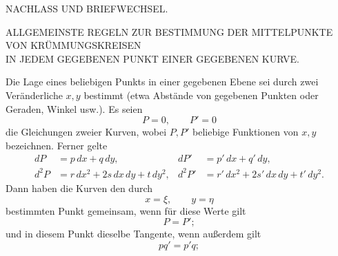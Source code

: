 %
\begin{center}
{\large NACHLASS UND BRIEFWECHSEL.\par}
\bigskip
ALLGEMEINSTE REGELN ZUR BESTIMMUNG DER MITTELPUNKTE VON KRÜMMUNGSKREISEN\\
IN JEDEM GEGEBENEN PUNKT EINER GEGEBENEN KURVE.
\end{center}

Die Lage eines beliebigen Punkts in einer gegebenen Ebene sei durch zwei Veränderliche $x,y$ bestimmt (etwa Abstände von gegebenen Punkten oder Geraden, Winkel usw.). Es seien
\[
P=0,\qquad P'=0
\]
die Gleichungen zweier Kurven, wobei $P,P'$ beliebige Funktionen von $x,y$ bezeichnen. Ferner gelte
\[
\begin{aligned}
dP&=p\,dx+q\,dy,&dP'&=p'\,dx+q'\,dy,\\
d^2P&=r\,dx^2+2s\,dx\,dy+t\,dy^2,&d^2P'&=r'\,dx^2+2s'\,dx\,dy+t'\,dy^2.
\end{aligned}
\]
Dann haben die Kurven den durch
\[
x=\xi,\qquad y=\eta
\]
bestimmten Punkt gemeinsam, wenn für diese Werte gilt
\[
P=P';
\]
und in diesem Punkt dieselbe Tangente, wenn außerdem gilt
\[
pq'=p'q;
\]

